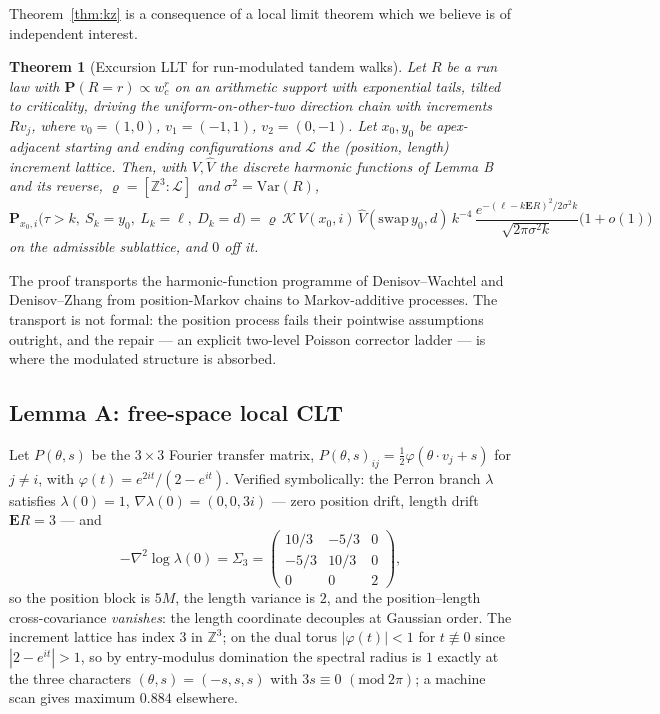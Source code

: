 \documentclass[11pt]{article}
\newtheorem{theorem}{Theorem}[section]
\theoremstyle{definition}
\newcommand{\E}{\mathbf{E}}
\newcommand{\Lat}{\mathcal{L}}
\renewcommand{\Pr}{\mathbf{P}}
\begin{document}
Theorem~\ref{thm:kz} is a consequence of a local limit theorem which we believe
is of independent interest.

\begin{theorem}[Excursion LLT for run-modulated tandem walks]\label{thm:llt}
Let $R$ be a run law with $\Pr(R=r)\propto w_c^{r}$ on an arithmetic support
with exponential tails, tilted to criticality, driving the
uniform-on-other-two direction chain with increments $Rv_j$, where
$v_0=(1,0)$, $v_1=(-1,1)$, $v_2=(0,-1)$. Let $x_0,y_0$ be apex-adjacent
starting and ending configurations and $\Lat$ the (position, length) increment
lattice. Then, with $V,\widehat V$ the discrete harmonic functions of Lemma B
and its reverse, $\varrho=[\mathbb{Z}^{3}:\Lat]$ and
$\sigma^{2}=\mathrm{Var}(R)$,
\[
  \Pr_{x_0,i}\bigl(\tau>k,\ S_k=y_0,\ L_k=\ell,\ D_k=d\bigr)
  =\varrho\,\mathcal K\,V(x_0,i)\,\widehat V(\mathrm{swap}\,y_0,d)\,
   k^{-4}\,\frac{e^{-(\ell-k\E R)^{2}/2\sigma^{2}k}}{\sqrt{2\pi\sigma^{2}k}}
   \bigl(1+o(1)\bigr)
\]
on the admissible sublattice, and $0$ off it.
\end{theorem}

The proof transports the harmonic-function programme of Denisov--Wachtel
\cite{DW} and Denisov--Zhang \cite{DZ} from position-Markov chains to
Markov-additive processes. The transport is not formal: the position process
fails their pointwise assumptions outright, and the repair --- an explicit
two-level Poisson corrector ladder --- is where the modulated structure is
absorbed.

\subsection{Lemma A: free-space local CLT}

Let $P(\theta,s)$ be the $3\times3$ Fourier transfer matrix,
$P(\theta,s)_{ij}=\tfrac12\varphi(\theta\cdot v_j+s)$ for $j\ne i$, with
$\varphi(t)=e^{2it}/(2-e^{it})$. Verified symbolically: the Perron branch
$\lambda$ satisfies $\lambda(0)=1$, $\nabla\lambda(0)=(0,0,3i)$ --- zero
position drift, length drift $\E R=3$ --- and
\[
  -\nabla^{2}\log\lambda(0)=\Sigma_3=
  \begin{pmatrix}10/3&-5/3&0\\-5/3&10/3&0\\0&0&2\end{pmatrix},
\]
so the position block is $5M$, the length variance is $2$, and the
position--length cross-covariance \emph{vanishes}: the length coordinate
decouples at Gaussian order. The increment lattice has index $3$ in
$\mathbb{Z}^{3}$; on the dual torus $|\varphi(t)|<1$ for $t\not\equiv0$ since
$|2-e^{it}|>1$, so by entry-modulus domination the spectral radius is $1$
exactly at the three characters $(\theta,s)=(-s,s,s)$ with $3s\equiv0$
$(\mathrm{mod}\ 2\pi)$; a machine scan gives maximum $0.884$ elsewhere.
\end{document}
